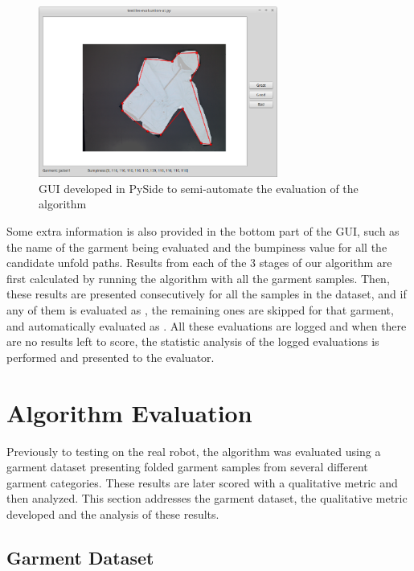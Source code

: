 \begin{figure}[thpb]
    \centering
    \includegraphics[width=0.7\textwidth]
    {figures/evaluation-gui.png}
    \caption[GUI developed in PySide to semi-automate the evaluation of the algorithm]
    {GUI developed in PySide to semi-automate the evaluation of the algorithm}
    \label{fig:gui}
\end{figure}


Some extra information is also provided in the bottom part of the GUI, such as the name of the garment being evaluated and the bumpiness value for all the candidate unfold paths. Results from each of the 3 stages of our algorithm are first calculated by running the algorithm with all the garment samples. Then, these results are presented consecutively for all the samples in the dataset, and if any of them is evaluated as \fail{}, the remaining ones are skipped for that garment, and automatically evaluated as \discarded{}. All these evaluations are logged and when there are no results left to score, the statistic analysis of the logged evaluations is performed and presented to the evaluator. 

\section{Algorithm Evaluation}
\label{experiments:evaluation}

Previously to testing on the real robot, the algorithm was evaluated using a garment dataset presenting folded garment samples from several different garment categories. These results are later scored with a qualitative metric and then analyzed. This section addresses the garment dataset, the qualitative metric developed and the analysis of these results.

\subsection{Garment Dataset}
\label{experiments:dataset}

